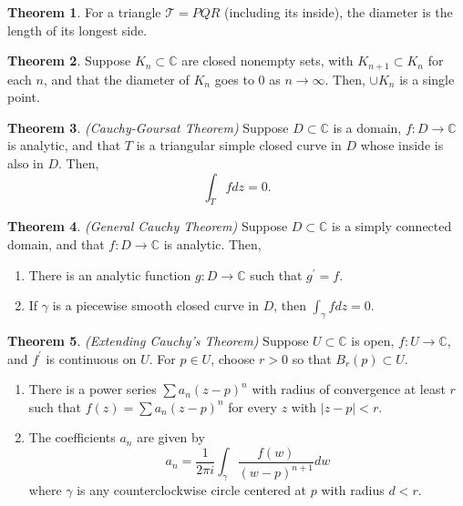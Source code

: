 \documentclass[a4paper]{article}
\theoremstyle{definition}
\newtheorem{theorem}{Theorem}
\begin{document}
	\begin{theorem}
		For a triangle $\mathcal{T} = PQR$ (including its inside), the diameter is the length of its longest side.
	\end{theorem}
	
	\begin{theorem}
		Suppose $K_{n} \subset \mathbb{C}$ are closed nonempty sets, with $K_{n+1} \subset K_{n}$ for each $n$, and that the diameter of $K_{n}$ goes to $0$ as $n \rightarrow \infty$. Then, $\cup K_{n}$ is a single point.
	\end{theorem}
	
	\begin{theorem}
		\emph{(Cauchy-Goursat Theorem)}
		Suppose $D \subset \mathbb{C}$ is a domain, $f : D \rightarrow \mathbb{C}$ is analytic, and that $T$ is a triangular simple closed curve in $D$ whose inside is also in $D$. Then,
		$$\int_{T}f dz = 0.$$
	\end{theorem}
	
	\begin{theorem}
		\emph{(General Cauchy Theorem)}
		Suppose $D \subset \mathbb{C}$ is a simply connected domain, and that $f : D \rightarrow \mathbb{C}$ is analytic. Then,
		\begin{enumerate}[label=\alph*.]
			\item There is an analytic function $g : D \rightarrow \mathbb{C}$ such that $g^{\prime} = f$.
			\item If $\gamma$ is a piecewise smooth closed curve in $D$, then $\int_{\gamma}f dz = 0$.
		\end{enumerate}
	\end{theorem}
	
	\begin{theorem}
		\emph{(Extending Cauchy's Theorem)}
		Suppose $U \subset \mathbb{C}$ is open, $f : U \rightarrow \mathbb{C}$, and $f^{\prime}$ is continuous on $U$. For $p \in U$, choose $r > 0$ so that $B_{r}(p) \subset U$.
		\begin{enumerate}[label=\alph*.]
			\item There is a power series $\sum a_{n} (z-p)^{n}$ with radius of convergence at least $r$ such that $f(z) = \sum a_{n} (z-p)^{n}$ for every $z$ with $|z-p| < r$.
			\item The coefficients $a_{n}$ are given by
			$$a_{n} = \frac{1}{2 \pi i} \int_{\gamma} \frac{f(w)}{(w-p)^{n+1}} dw$$
			where $\gamma$ is any counterclockwise circle centered at $p$ with radius $d < r$.
		\end{enumerate}
	\end{theorem}
	
\end{document}
